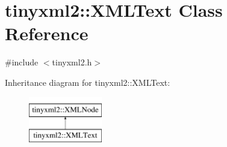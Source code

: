 \hypertarget{classtinyxml2_1_1_x_m_l_text}{}\section{tinyxml2\+:\+:X\+M\+L\+Text Class Reference}
\label{classtinyxml2_1_1_x_m_l_text}


{\ttfamily \#include $<$tinyxml2.\+h$>$}

Inheritance diagram for tinyxml2\+:\+:X\+M\+L\+Text\+:\begin{figure}[H]
\begin{center}
\leavevmode
\includegraphics[height=2.000000cm]{classtinyxml2_1_1_x_m_l_text}
\end{center}
\end{figure}
